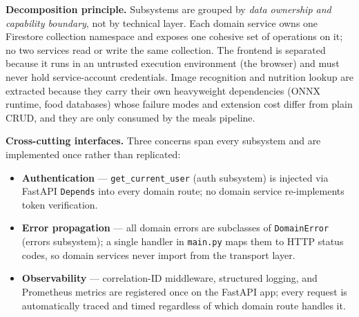 \documentclass[11pt]{article}
\begin{document}
\textbf{Decomposition principle.}
Subsystems are grouped by \emph{data ownership and capability boundary}, not by technical layer.
Each domain service owns one Firestore collection namespace and exposes one cohesive set of
operations on it; no two services read or write the same collection.
The frontend is separated because it runs in an untrusted execution environment (the browser)
and must never hold service-account credentials.
Image recognition and nutrition lookup are extracted because they carry their own heavyweight
dependencies (ONNX runtime, food databases) whose failure modes and extension cost differ
from plain CRUD, and they are only consumed by the meals pipeline.

\textbf{Cross-cutting interfaces.}
Three concerns span every subsystem and are implemented once rather than replicated:
\begin{itemize}[leftmargin=1.2em, topsep=2pt]
  \item \textbf{Authentication} --- \texttt{get\_current\_user} (auth subsystem) is injected
        via FastAPI \texttt{Depends} into every domain route; no domain service re-implements
        token verification.
  \item \textbf{Error propagation} --- all domain errors are subclasses of \texttt{DomainError}
        (errors subsystem); a single handler in \texttt{main.py} maps them to HTTP status codes,
        so domain services never import from the transport layer.
  \item \textbf{Observability} --- correlation-ID middleware, structured logging, and Prometheus
        metrics are registered once on the FastAPI app; every request is automatically traced
        and timed regardless of which domain route handles it.
\end{itemize}
\end{document}
